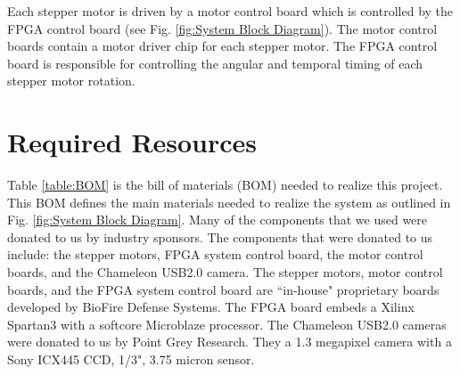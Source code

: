 \documentclass[final, letterpaper, 10 pt, conference, onecolumn]{IEEEtran}
\begin{document}
Each stepper motor is driven by a motor control board which is controlled by the FPGA control board (see Fig. \ref{fig:System Block Diagram}). The motor control boards contain a motor driver chip for each stepper motor. The FPGA control board is responsible for controlling the angular and temporal timing of each stepper motor rotation.

\section{Required Resources}
Table \ref{table:BOM} is the bill of materials (BOM) needed to realize this project. This BOM defines the main materials needed to realize the system as outlined in Fig. \ref{fig:System Block Diagram}.
Many of the components that we used were donated to us by industry sponsors. The components that were donated to us include: the stepper motors, FPGA system control board, the
motor control boards, and the Chameleon USB2.0 camera. The stepper motors, motor control boards, and the FPGA system control board are ``in-house" proprietary boards developed by BioFire Defense Systems.
The FPGA board embeds a Xilinx Spartan3 with a softcore Microblaze processor. The Chameleon USB2.0 cameras were donated to us by Point Grey Research. They a 1.3 megapixel camera with a Sony ICX445 CCD, 1/3", 3.75 micron sensor.

\begin{table}[!ht]
\caption{Main component BOM}
\label{table:BOM}
\end{table}
\end{document}
